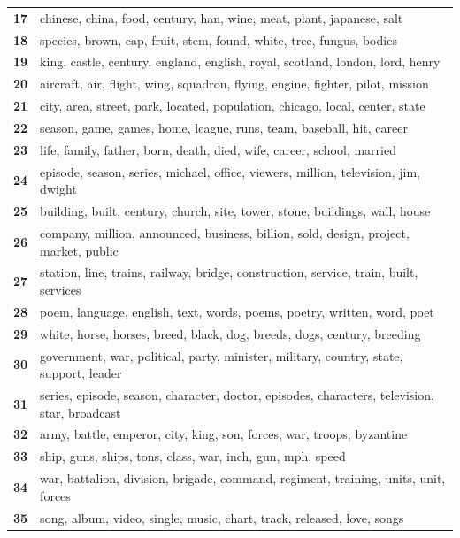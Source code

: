 \begin{table}[htpb]
\begin{tabularx}{\textwidth}{@{}l X@{}}
        \textbf{17} & chinese, china, food, century, han, wine, meat, plant, japanese, salt \\
        \textbf{18} & species, brown, cap, fruit, stem, found, white, tree, fungus, bodies \\
        \textbf{19} & king, castle, century, england, english, royal, scotland, london, lord, henry \\
        \textbf{20} & aircraft, air, flight, wing, squadron, flying, engine, fighter, pilot, mission \\
        \textbf{21} & city, area, street, park, located, population, chicago, local, center, state \\
        \textbf{22} & season, game, games, home, league, runs, team, baseball, hit, career \\
        \textbf{23} & life, family, father, born, death, died, wife, career, school, married \\
        \textbf{24} & episode, season, series, michael, office, viewers, million, television, jim, dwight \\
        \textbf{25} & building, built, century, church, site, tower, stone, buildings, wall, house \\
        \textbf{26} & company, million, announced, business, billion, sold, design, project, market, public \\
        \textbf{27} & station, line, trains, railway, bridge, construction, service, train, built, services \\
        \textbf{28} & poem, language, english, text, words, poems, poetry, written, word, poet \\
        \textbf{29} & white, horse, horses, breed, black, dog, breeds, dogs, century, breeding \\
        \textbf{30} & government, war, political, party, minister, military, country, state, support, leader \\
        \textbf{31} & series, episode, season, character, doctor, episodes, characters, television, star, broadcast \\
        \textbf{32} & army, battle, emperor, city, king, son, forces, war, troops, byzantine \\
        \textbf{33} & ship, guns, ships, tons, class, war, inch, gun, mph, speed \\
        \textbf{34} & war, battalion, division, brigade, command, regiment, training, units, unit, forces \\
        \textbf{35} & song, album, video, single, music, chart, track, released, love, songs \\

\end{tabularx}
\end{table}
